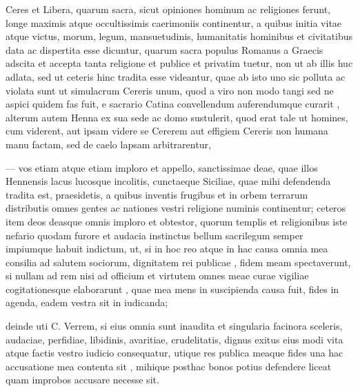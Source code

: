  Ceres et Libera, quarum sacra, sicut opiniones hominum ac religiones ferunt, longe maximis atque occultissimis caerimoniis continentur, a quibus initia vitae atque victus, morum, legum, mansuetudinis, humanitatis hominibus et civitatibus data ac dispertita esse dicuntur, quarum sacra populus Romanus a Graecis adscita et accepta tanta religione et publice et privatim tuetur, non ut ab illis huc adlata, sed ut ceteris hinc tradita esse videantur, quae ab isto uno sic polluta ac violata sunt ut simulacrum Cereris unum, quod a viro non modo tangi sed ne aspici quidem fas fuit, e sacrario Catina convellendum auferendumque curarit , alterum autem Henna ex sua sede ac domo sustulerit, quod erat tale ut homines, cum viderent, aut ipsam videre se Cererem aut effigiem Cereris non humana manu factam, sed de caelo lapsam arbitrarentur,

 — vos etiam atque etiam imploro et appello, sanctissimae deae, quae illos Hennensis lacus lucosque incolitis, cunctaeque Siciliae, quae mihi defendenda tradita est, praesidetis, a quibus inventis frugibus et in orbem terrarum distributis omnes gentes ac nationes vestri religione numinis continentur; ceteros item deos deasque omnis imploro et obtestor, quorum templis et religionibus iste nefario quodam furore et audacia instinctus bellum sacrilegum semper impiumque habuit indictum, ut, si in hoc reo atque in hac causa omnia mea consilia ad salutem sociorum, dignitatem rei publicae , fidem meam spectaverunt, si nullam ad rem nisi ad officium et virtutem omnes meae curae vigiliae cogitationesque elaborarunt , quae mea mens in suscipienda causa fuit, fides in agenda, eadem vestra sit in iudicanda;

 deinde uti C. Verrem, si eius omnia sunt inaudita et singularia facinora sceleris, audaciae, perfidiae, libidinis, avaritiae, crudelitatis, dignus exitus eius modi vita atque factis vestro iudicio consequatur, utique res publica meaque fides una hac accusatione mea contenta sit , mihique posthac bonos potius defendere liceat quam improbos accusare necesse sit.

